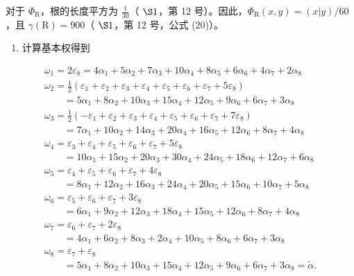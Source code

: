 对于 \(\Phi_{\mathrm{R}}\)，根的长度平方为 \(\frac{1}{30}\)（ \(\S 1\)，第 12 号）。因此，\(\Phi_{\mathrm{R}}(x,y) = (x|y)/60\)，且 \(\gamma(\mathrm{R}) = 900\)（ \(\S 1\)，第 12 号，公式 (20)）。

\begin{enumerate}
\def\labelenumi{(\Roman{enumi})}
\setcounter{enumi}{5}
\tightlist
\item
  计算基本权得到
\end{enumerate}

\[
\begin{array}{l} \omega_ {1} = 2 \varepsilon_ {8} = 4 \alpha_ {1} + 5 \alpha_ {2} + 7 \alpha_ {3} + 10 \alpha_ {4} + 8 \alpha_ {5} + 6 \alpha_ {6} + 4 \alpha_ {7} + 2 \alpha_ {8} \\ \omega_ {2} = \frac {1}{2} (\varepsilon_ {1} + \varepsilon_ {2} + \varepsilon_ {3} + \varepsilon_ {4} + \varepsilon_ {5} + \varepsilon_ {6} + \varepsilon_ {7} + 5 \varepsilon_ {8}) \\ \qquad = 5 \alpha_ {1} + 8 \alpha_ {2} + 10 \alpha_ {3} + 15 \alpha_ {4} + 12 \alpha_ {5} + 9 \alpha_ {6} + 6 \alpha_ {7} + 3 \alpha_ {8} \\ \omega_ {3} = \frac {1}{2} (- \varepsilon_ {1} + \varepsilon_ {2} + \varepsilon_ {3} + \varepsilon_ {4} + \varepsilon_ {5} + \varepsilon_ {6} + \varepsilon_ {7} + 7 \varepsilon_ {8}) \\ \qquad = 7 \alpha_ {1} + 10 \alpha_ {2} + 14 \alpha_ {3} + 20 \alpha_ {4} + 16 \alpha_ {5} + 12 \alpha_ {6} + 8 \alpha_ {7} + 4 \alpha_ {8} \\ \omega_ {4} = \varepsilon_ {3} + \varepsilon_ {4} + \varepsilon_ {5} + \varepsilon_ {6} + \varepsilon_ {7} + 5 \varepsilon_ {8} \\ \qquad = 10 \alpha_ {1} + 15 \alpha_ {2} + 20 \alpha_ {3} + 30 \alpha_ {4} + 24 \alpha_ {5} + 18 \alpha_ {6} + 12 \alpha_ {7} + 6 \alpha_ {8} \\ \omega_ {5} = \varepsilon_ {4} + \varepsilon_ {5} + \varepsilon_ {6} + \varepsilon_ {7} + 4 \varepsilon_ {8} \\ \qquad = 8 \alpha_ {1} + 12 \alpha_ {2} + 16 \alpha_ {3} + 24 \alpha_ {4} + 20 \alpha_ {5} + 15 \alpha_ {6} + 10 \alpha_ {7} + 5 \alpha_ {8} \\ \omega_ {6} = \varepsilon_ {5} + \varepsilon_ {6} + \varepsilon_ {7} + 3 \varepsilon_ {8} \\ \qquad = 6 \alpha_ {1} + 9 \alpha_ {2} + 12 \alpha_ {3} + 18 \alpha_ {4} + 15 \alpha_ {5} + 12 \alpha_ {6} + 8 \alpha_ {7} + 4 \alpha_ {8} \\ \omega_ {7} = \varepsilon_ {6} + \varepsilon_ {7} + 2 \varepsilon_ {8} \\ \qquad = 4 \alpha_ {1} + 6 \alpha_ {2} + 8 \alpha_ {3} + 2 \alpha_ {4} + 10 \alpha_ {5} + 8 \alpha_ {6} + 6 \alpha_ {7} + 3 \alpha_ {8} \\ \omega_ {8} = \varepsilon_ {7} + \varepsilon_ {8} \\ \qquad = 5 \alpha_ {1} + 8 \alpha_ {2} + 10 \alpha_ {3} + 15 \alpha_ {4} + 12 \alpha_ {5} + 9 \alpha_ {6} + 6 \alpha_ {7} + 3 \alpha_ {8} = \tilde {\alpha}. \end{array}
\]

